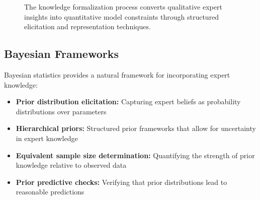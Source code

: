 \begin{figure}[htbp]
    \centering
    \caption{The knowledge formalization process converts qualitative expert insights into quantitative model constraints through structured elicitation and representation techniques.}
    \label{fig:knowledge-formalization}
\end{figure}

\subsection{Bayesian Frameworks}

Bayesian statistics provides a natural framework for incorporating expert knowledge:

\begin{itemize}
    \item \textbf{Prior distribution elicitation:} Capturing expert beliefs as probability distributions over parameters
    \item \textbf{Hierarchical priors:} Structured prior frameworks that allow for uncertainty in expert knowledge
    \item \textbf{Equivalent sample size determination:} Quantifying the strength of prior knowledge relative to observed data
    \item \textbf{Prior predictive checks:} Verifying that prior distributions lead to reasonable predictions
\end{itemize}

